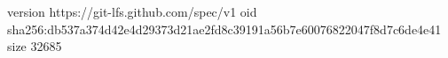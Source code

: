 version https://git-lfs.github.com/spec/v1
oid sha256:db537a374d42e4d29373d21ae2fd8c39191a56b7e60076822047f8d7c6de4e41
size 32685
